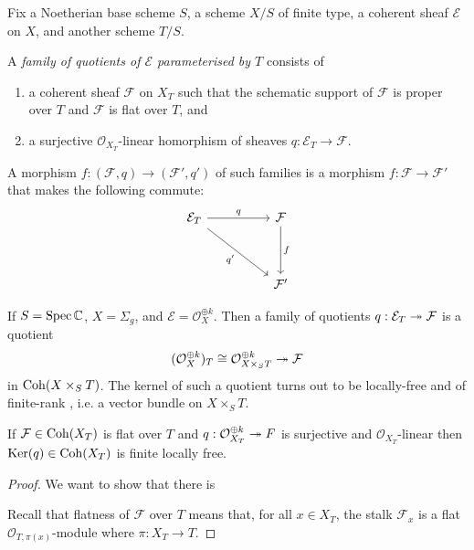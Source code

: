 \documentclass{article}
\begin{document}
Fix a Noetherian base scheme $S$, a scheme $X/S$ of finite type,
a coherent sheaf $\mathcal E$ on $X$, and another scheme $T/S$.

\begin{definition}
  A \emph{family of quotients of $\mathcal E$ parameterised by $T$} consists of
  \begin{enumerate}
    \item a coherent sheaf $\mathcal F$ on $X_T$
      such that the schematic support of $\mathcal F$ is proper
      over $T$ and $\mathcal F$ is flat over $T$, and
    \item a surjective $\mathcal O_{X_T}$-linear
      homorphism of sheaves $q:\mathcal E_T\to \mathcal F$.
  \end{enumerate}
  A morphism $f:(\mathcal F,q)\to(\mathcal F',q')$ of such families
  is a morphism $f:\mathcal F\to\mathcal F'$ that makes the following
  commute:
  \begin{equation*}
    \begin{tikzcd}
      {\mathcal E_T} && {\mathcal F} \\
      \\
                     && {\mathcal F'}
                     \arrow["q", from=1-1, to=1-3]
                     \arrow["{q'}"', from=1-1, to=3-3]
                     \arrow["f", from=1-3, to=3-3]
    \end{tikzcd}
  \end{equation*}
\end{definition}

\begin{example}
  If $S=\operatorname{Spec}\mathbb C$, $X=\Sigma_g$, and
  $\mathcal E=\mathcal O^{\oplus k}_X$.
  Then a family of quotients $q:\mathcal E_T\twoheadrightarrow\mathcal F$
  is a quotient
  \begin{align*}
    (\mathcal O^{\oplus k}_X)_T \cong \mathcal O^{\oplus k}_{X\times_S T} \twoheadrightarrow \mathcal F
  \end{align*}
  in $\operatorname{Coh}(X\times_S T)$.
  The kernel of such a quotient turns out to be locally-free
  and of finite-rank \cite[Lemma 4.21]{bertram1993}, i.e. a
  vector bundle on $X\times_S T$.
\end{example}

\begin{lemma}
  If $\mathcal F\in\operatorname{Coh}(X_T)$ is flat over $T$ and
  $q:\mathcal O_{X_T}^{\oplus k} \twoheadrightarrow F$ is surjective and
  $\mathcal O_{X_T}$-linear then $\operatorname{Ker}(q)\in\operatorname{Coh}(X_T)$ is
  finite locally free.
  \begin{proof}
    We want to show that there is

    Recall that flatness of $\mathcal F$ over $T$ means that,
    for all $x\in X_T$, the stalk $\mathcal F_x$ is a flat
    $\mathcal O_{T,\pi(x)}$-module where
    $\pi : X_T \to T$.
    \missingproof
  \end{proof}
\end{lemma}
\end{document}
